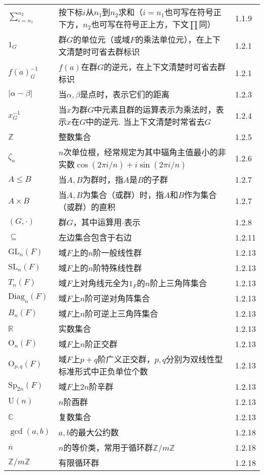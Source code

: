 \begin{longtable}{lp{.6\linewidth}l}
	$\sum_{i=n_1}^{n_2}$ & 按下标$i$从$n_1$到$n_2$求和（$i=n_1$也可写在符号正下方，$n_2$也可写在符号正上方，下文$\prod$同）& 1.1.9\\
	$1_G$ & 群$G$的单位元（或域$F$的乘法单位元），在上下文清楚时可省去群标识 & 1.2.1\\
	$f(a)_G^{-1}$ & $f(a)$在群$G$的逆元，在上下文清楚时可省去群标识 & 1.2.1\\
	$|\alpha-\beta|$ & 当$\alpha,\beta$是点时，表示它们的距离 & 1.2.3\\
	$x^{-1}_G$ & 当$x$为群$G$中元素且群的运算表示为乘法时，表示$x$在$G$中的逆元. 当上下文清楚时常省去$G$ & 1.2.4\\
	$\mathbb{Z}$ & 整数集合 & 1.2.5\\
	$\zeta_n$ & $n$次单位根，经常规定为其中辐角主值最小的非实数$\cos(2\pi i/n)+i\sin(2\pi i/n)$ & 1.2.6\\
	$A\leq B$ & 当$A,B$为群时，指$A$是$B$的子群 & 1.2.7\\
	$A\times B$ & 当$A,B$为集合（或群）时，指$A$和$B$作为集合（或群）的直积 & 1.2.7\\
	$(G, \cdot)$ & 群$G$，其中运算用$\cdot$表示 & 1.2.8\\
	$\subseteq$ & 左边集合包含于右边 & 1.2.11\\
	$\mathrm{GL}_n(F)$ & 域$F$上的$n$阶一般线性群 & 1.2.13\\
	$\mathrm{SL}_n(F)$ & 域$F$上的$n$阶特殊线性群 & 1.2.13\\
	$T_n(F)$ & 域$F$上对角线元全为$1_F$的$n$阶上三角阵集合 & 1.2.13\\
	$\mathrm{Diag}_n(F)$ & 域$F$上$n$阶可逆对角阵集合 & 1.2.13\\
	$B_n(F)$ & 域$F$上$n$阶可逆上三角阵集合 & 1.2.13\\
	$\mathbb{R}$ & 实数集合 & 1.2.13\\
	$\mathrm{O}_n(F)$ & 域$F$上$n$阶正交群 & 1.2.13\\
	$\mathrm{O}_{p,q}(F)$ & 域$F$上$p+q$阶广义正交群，$p,q$分别为双线性型标准形式中正负单位个数 & 1.2.13\\
	$\mathrm{Sp}_{2n}(F)$ & 域$F$上$2n$阶辛群 & 1.2.13\\
	$\mathrm{U}(n)$ & $n$阶酉群 & 1.2.13\\
	$\mathbb{C}$ & 复数集合 & 1.2.13\\
	$\gcd(a,b)$ & $a,b$的最大公约数 & 1.2.18\\
	$\overline{n}$ & $n$的等价类，常用于循环群$\mathbb{Z}/m\mathbb{Z}$ & 1.2.18\\
	$\mathbb{Z}/m\mathbb{Z}$ & 有限循环群 & 1.2.18\\

\end{longtable}
